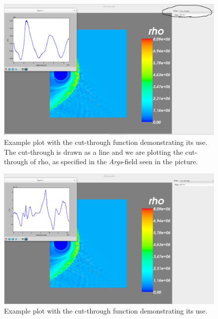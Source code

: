 \documentclass[a4paper,10pt]{article}
\begin{document}
\begin{figure}[H]
 \centering
 \includegraphics[width=\textwidth]{../../images/cut_through1.png}
 \caption{Example plot with the cut-through function demonstrating its use. The cut-through is drawn as a 
 line and we are plotting the cut-through of rho, as specified in the \emph{Args}-field seen in the picture.}
 \label{fig:cut_through1}
\end{figure}

\begin{figure}[H]
 \centering
 \includegraphics[width=\textwidth]{../../images/cut_through2.png}
 \caption{Example plot with the cut-through function demonstrating its use.}
 \label{fig:cut_through2}
\end{figure}
\end{document}
